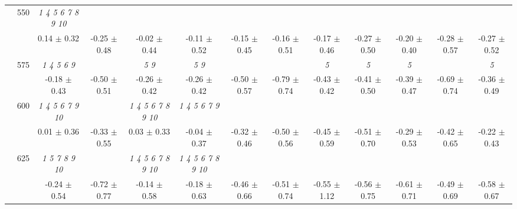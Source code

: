 \begin{table}[h]
{\begin{tabular}{
        ccccccccccccc}
 & \multirow{2}{*}{550}& \textit{  1  4  5  6  7  8  9 10 }& & & & & & & & & &  \\ 
 & & 0.14 $\pm$ 0.32& -0.25 $\pm$ 0.48& -0.02 $\pm$ 0.44& -0.11 $\pm$ 0.52& -0.15 $\pm$ 0.45& -0.16 $\pm$ 0.51& -0.17 $\pm$ 0.46& -0.27 $\pm$ 0.50& -0.20 $\pm$ 0.40& -0.28 $\pm$ 0.57& -0.27 $\pm$ 0.52 \\ 
 & \multirow{2}{*}{575}& \cellcolor[HTML]{EFEFEF} \textit{ 1 4 5 6 9 }& \cellcolor[HTML]{EFEFEF} & \cellcolor[HTML]{EFEFEF} \textit{ 5 9 }& \cellcolor[HTML]{EFEFEF} \textit{ 5 9 }& \cellcolor[HTML]{EFEFEF} & \cellcolor[HTML]{EFEFEF} & \cellcolor[HTML]{EFEFEF} \textit{ 5 }& \cellcolor[HTML]{EFEFEF} \textit{ 5 }& \cellcolor[HTML]{EFEFEF} \textit{ 5 }& \cellcolor[HTML]{EFEFEF} & \cellcolor[HTML]{EFEFEF} \textit{ 5 } \\ 
 & & \cellcolor[HTML]{EFEFEF} -0.18 $\pm$ 0.43& \cellcolor[HTML]{EFEFEF} -0.50 $\pm$ 0.51& \cellcolor[HTML]{EFEFEF} -0.26 $\pm$ 0.42& \cellcolor[HTML]{EFEFEF} -0.26 $\pm$ 0.42& \cellcolor[HTML]{EFEFEF} -0.50 $\pm$ 0.57& \cellcolor[HTML]{EFEFEF} -0.79 $\pm$ 0.74& \cellcolor[HTML]{EFEFEF} -0.43 $\pm$ 0.42& \cellcolor[HTML]{EFEFEF} -0.41 $\pm$ 0.50& \cellcolor[HTML]{EFEFEF} -0.39 $\pm$ 0.47& \cellcolor[HTML]{EFEFEF} -0.69 $\pm$ 0.74& \cellcolor[HTML]{EFEFEF} -0.36 $\pm$ 0.49 \\ 
 & \multirow{2}{*}{600}& \textit{  1  4  5  6  7  9 10 }& & \textit{  1  4  5  6  7  8  9 10 }& \textit{ 1 4 5 6 7 9 }& & & & & & &  \\ 
 & & 0.01 $\pm$ 0.36& -0.33 $\pm$ 0.55& 0.03 $\pm$ 0.33& -0.04 $\pm$ 0.37& -0.32 $\pm$ 0.46& -0.50 $\pm$ 0.56& -0.45 $\pm$ 0.59& -0.51 $\pm$ 0.70& -0.29 $\pm$ 0.53& -0.42 $\pm$ 0.65& -0.22 $\pm$ 0.43 \\ 
 & \multirow{2}{*}{625}& \cellcolor[HTML]{EFEFEF} \textit{  1  5  7  8  9 10 }& \cellcolor[HTML]{EFEFEF} & \cellcolor[HTML]{EFEFEF} \textit{  1  4  5  6  7  8  9 10 }& \cellcolor[HTML]{EFEFEF} \textit{  1  4  5  6  7  8  9 10 }& \cellcolor[HTML]{EFEFEF} & \cellcolor[HTML]{EFEFEF} & \cellcolor[HTML]{EFEFEF} & \cellcolor[HTML]{EFEFEF} & \cellcolor[HTML]{EFEFEF} & \cellcolor[HTML]{EFEFEF} & \cellcolor[HTML]{EFEFEF}  \\ 
 & & \cellcolor[HTML]{EFEFEF} -0.24 $\pm$ 0.54& \cellcolor[HTML]{EFEFEF} -0.72 $\pm$ 0.77& \cellcolor[HTML]{EFEFEF} -0.14 $\pm$ 0.58& \cellcolor[HTML]{EFEFEF} -0.18 $\pm$ 0.63& \cellcolor[HTML]{EFEFEF} -0.46 $\pm$ 0.66& \cellcolor[HTML]{EFEFEF} -0.51 $\pm$ 0.74& \cellcolor[HTML]{EFEFEF} -0.55 $\pm$ 1.12& \cellcolor[HTML]{EFEFEF} -0.56 $\pm$ 0.75& \cellcolor[HTML]{EFEFEF} -0.61 $\pm$ 0.71& \cellcolor[HTML]{EFEFEF} -0.49 $\pm$ 0.69& \cellcolor[HTML]{EFEFEF} -0.58 $\pm$ 0.67 \\ 

\end{tabular}}
\end{table}
